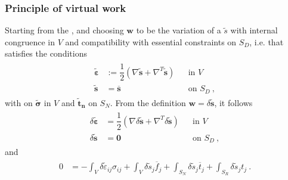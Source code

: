 \documentclass[letterpaper,10pt,english]{jupyterBook}
\begin{document}
\subsubsection{Principle of virtual work}
\label{\detokenize{ch/solids/small-displacements-statics-weak-form-3d:principle-of-virtual-work}}\label{\detokenize{ch/solids/small-displacements-statics-weak-form-3d:solid-mechanics-intro-small-displacements-statics-weak-form-weak-pvw}}
\sphinxAtStartPar
Starting from the {\hyperref[\detokenize{ch/solids/small-displacements-statics-weak-form-3d:solid-mechanics-intro-small-displacements-statics-weak-form-weak-equilibrium}]{}}, and choosing \(\mathbf{w}\) to be the variation of a  \(\widetilde{s}\)  with internal congruence in \(V\) and compatibility with  essential constraints on \(S_D\), i.e. that satisfies the conditions
\begin{equation*}
\begin{split}\begin{aligned}
  \widetilde{\boldsymbol{\varepsilon}} & := \dfrac{1}{2} \left( \nabla \widetilde{\mathbf{s}} + \nabla^T \widetilde{\mathbf{s}} \right) && \text{in $V$} \\
  \widetilde{\mathbf{s}} & = \overline{\mathbf{s}} && \text{on $S_D$} \ ,
\end{aligned}\end{split}
\end{equation*}
\sphinxAtStartPar
with  on \(\widetilde{\boldsymbol\sigma}\) in \(V\) and \(\widetilde{\mathbf{t}}_{\mathbf{n}}\) on \(S_N\). From the definition \(\mathbf{w} = \delta \widetilde{\mathbf{s}}\), it follows
\begin{equation*}
\begin{split}\begin{aligned}
  \delta \widetilde{\boldsymbol{\varepsilon}} & = \dfrac{1}{2} \left( \nabla \delta \widetilde{\mathbf{s}} + \nabla^T \delta \widetilde{\mathbf{s}} \right) && \text{in $V$} \\
  \delta \widetilde{\mathbf{s}} & = \mathbf{0} && \text{on $S_D$} \ ,
\end{aligned}\end{split}
\end{equation*}
\sphinxAtStartPar
and
\begin{equation*}
\begin{split}\begin{aligned}
0 & = - \int_{V} \delta \widetilde{\varepsilon}_{ij} \sigma_{ij} + \int_{V}  \delta \widetilde{s}_j \overline{f}_j + \int_{S_N} \delta \widetilde{s}_j \overline{t}_j + \int_{S_R} \delta \widetilde{s}_j t_j \ .
\end{aligned}\end{split}
\end{equation*}
\end{document}
